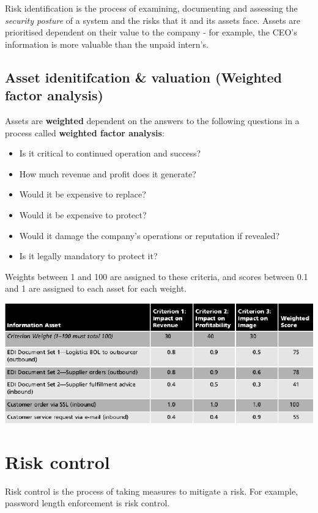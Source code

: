 \documentclass[12pt]{report}
\begin{document}
Risk identification is the process of examining, documenting and assessing the \textit{security posture} of a system and the risks that it and
its assets face. Assets are prioritised dependent on their value to the company - for example, the CEO's information is more valuable than the unpaid intern's.

\subsection{Asset idenitifcation \& valuation \textbf{(Weighted factor analysis)}}
Assets are \textbf{weighted} dependent on the answers to the following questions in a process called \textbf{weighted factor analysis}:
\begin{itemize}
	\item Is it critical to continued operation and success?
	\item How much revenue and profit does it generate?
	\item Would it be expensive to replace?
	\item Would it be expensive to protect?
	\item Would it damage the company's operations or reputation if revealed?
	\item Is it legally mandatory to protect it?
\end{itemize}

\noindent Weights between 1 and 100 are assigned to these criteria, and scores between 0.1 and 1 are assigned to each asset for each weight.

\vspace{10pt}
\includegraphics[width=0.95\linewidth]{WeightedFactorAnalysis.png}

\pagebreak

\section{Risk control}
Risk control is the process of taking measures to mitigate a risk. For example, password length enforcement is risk control.
\end{document}
